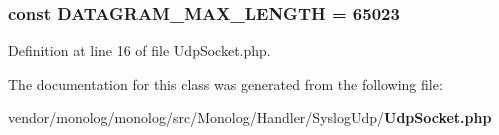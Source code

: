 \subsubsection[{D\+A\+T\+A\+G\+R\+A\+M\+\_\+\+M\+A\+X\+\_\+\+L\+E\+N\+G\+T\+H}]{\setlength{\rightskip}{0pt plus 5cm}const D\+A\+T\+A\+G\+R\+A\+M\+\_\+\+M\+A\+X\+\_\+\+L\+E\+N\+G\+T\+H = 65023}\label{class_monolog_1_1_handler_1_1_syslog_udp_1_1_udp_socket_aef13a0891143bd7229521c8c12736f36}


Definition at line 16 of file Udp\+Socket.\+php.



The documentation for this class was generated from the following file\+:\begin{DoxyCompactItemize}
\item 
vendor/monolog/monolog/src/\+Monolog/\+Handler/\+Syslog\+Udp/{\bf Udp\+Socket.\+php}\end{DoxyCompactItemize}
